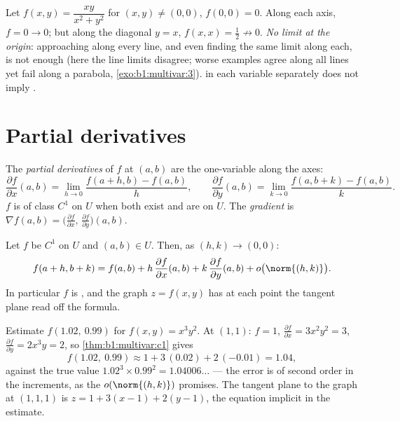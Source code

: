 \begin{example}\label{ex:b1:multivar:trap}
Let $f(x, y) = \dfrac{xy}{x^2 + y^2}$ for $(x,y) \neq (0,0)$, $f(0,
0) = 0$. Along each axis, $f = 0 \to 0$; but along the diagonal $y
= x$, $f(x, x) = \frac12 \not\to 0$. \emph{No limit at the origin}:
approaching along every line, and even finding the same limit along
each, is not enough (here the line limits disagree; worse examples
agree along all lines yet fail along a parabola,
\cref{exo:b1:multivar:3}).  in each variable separately
does not imply .
\end{example}

\section{Partial derivatives}

\begin{definition}\label{def:b1:multivar:partial}
The \emph{partial derivatives} of $f$ at
$(a, b)$ are the one-variable  along the axes:
\[
\frac{\partial f}{\partial x}(a,b)
= \lim_{h \to 0} \frac{f(a + h, b) - f(a,b)}{h},
\qquad
\frac{\partial f}{\partial y}(a,b)
= \lim_{k \to 0} \frac{f(a, b + k) - f(a,b)}{k}.
\]
$f$ is of class $C^1$ on $U$ when both exist and are  on
$U$. The \emph{gradient} is $\nabla f(a,b) =
\bigl(\frac{\partial f}{\partial x},\, \frac{\partial f}{\partial
y}\bigr)(a,b)$.
\end{definition}

\begin{theorem}\label{thm:b1:multivar:c1}
Let $f$ be $C^1$ on $U$ and $(a,b) \in U$. Then, as $(h, k) \to
(0,0)$:
\[
f(a + h, b + k) = f(a, b)
+ h\,\frac{\partial f}{\partial x}(a,b)
+ k\,\frac{\partial f}{\partial y}(a,b)
+ o\bigl(\norm{(h,k)}\bigr) .
\]
In particular $f$ is , and the graph $z = f(x,y)$ has at
each point the tangent plane read off the formula.
\end{theorem}

\begin{example}
\label{ex:b1:multivar:linapprox}
Estimate $f(1.02,\ 0.99)$ for $f(x, y) = x^3y^2$. At $(1, 1)$:
$f = 1$, $\frac{\partial f}{\partial x} = 3x^2y^2 = 3$,
$\frac{\partial f}{\partial y} = 2x^3y = 2$, so
\cref{thm:b1:multivar:c1} gives
\[
f(1.02,\ 0.99) \approx 1 + 3\,(0.02) + 2\,(-0.01) = 1.04 ,
\]
against the true value $1.02^3 \times 0.99^2 = 1.04006\dots$ ---
the error is of second order in the increments, as the
$o(\norm{(h,k)})$ promises. The tangent plane to the graph at
$(1, 1, 1)$ is $z = 1 + 3(x - 1) + 2(y - 1)$, the equation
implicit in the estimate.
\end{example}

